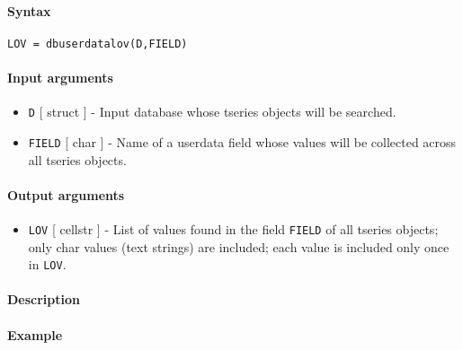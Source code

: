 


	\paragraph{Syntax}\label{syntax}

\begin{verbatim}
LOV = dbuserdatalov(D,FIELD)
\end{verbatim}

\paragraph{Input arguments}\label{input-arguments}

\begin{itemize}
\item
  \texttt{D} {[} struct {]} - Input database whose tseries objects will
  be searched.
\item
  \texttt{FIELD} {[} char {]} - Name of a userdata field whose values
  will be collected across all tseries objects.
\end{itemize}

\paragraph{Output arguments}\label{output-arguments}

\begin{itemize}
\itemsep1pt\parskip0pt
\item
  \texttt{LOV} {[} cellstr {]} - List of values found in the field
  \texttt{FIELD} of all tseries objects; only char values (text strings)
  are included; each value is included only once in \texttt{LOV}.
\end{itemize}

\paragraph{Description}\label{description}

\paragraph{Example}\label{example}


